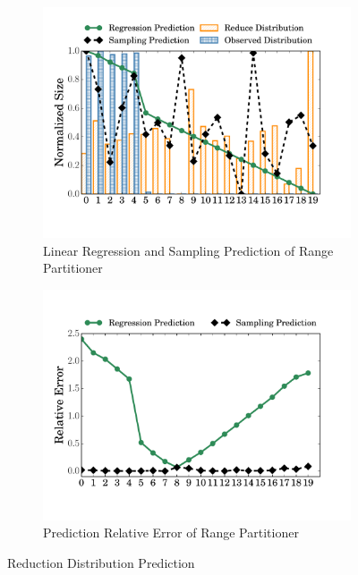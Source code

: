 \begin{figure}
	\centering
	\begin{subfigure}{0.75\linewidth}
		\includegraphics[width=\linewidth]{fig/range_pre_sample}
		\caption{Linear Regression and Sampling Prediction of Range Partitioner}
		\label{fig:range_pre_sample}
	\end{subfigure}
	\begin{subfigure}{0.75\linewidth}
		\includegraphics[width=\linewidth]{fig/prediction_relative_error}
		\caption{Prediction Relative Error of Range Partitioner\newline}
		\label{fig:prediction_relative_error}
	\end{subfigure}
	\caption{Reduction Distribution Prediction}
	\label{fig:dis}
\end{figure}
